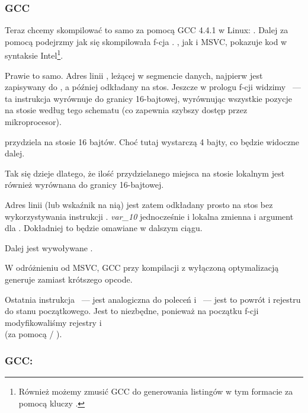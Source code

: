 \subsubsection{GCC}

Teraz chcemy skompilować to samo za pomocą GCC 4.4.1 w Linux: .
Dalej za pomocą \IDA podejrzmy jak się skompilowała f-cja \main.
\IDA, jak i MSVC, pokazuje kod w syntaksie Intel\footnote{Również możemy zmusić GCC do generowania listingów w tym formacie za pomocą kluczy .}.



Prawie to samo. 
Adres linii , leżącej w segmencie danych, najpierw jest zapisywany do \EAX, a później odkładany na stos.
Jeszcze w prologu f-cji widzimy ~--- 
ta instrukcja wyrównuje \ESP do granicy 16-bajtowej, wyrównując wszystkie pozycje 
na stosie według tego schematu (co zapewnia szybszy dostęp przez mikroprocesor).

 przydziela na stosie 16 bajtów. Choć tutaj wystarczą 4 bajty, co będzie widoczne dalej.

Tak się dzieje dlatego, że ilość przydzielanego miejsca na stosie lokalnym jest również wyrównana do granicy 16-bajtowej.

Adres linii (lub wskaźnik na nią) jest zatem odkładany prosto na stos bez wykorzystywania instrukcji \PUSH.
\emph{var\_10} jednocześnie i lokalna zmienna i argument dla \printf{}. Dokładniej to będzie omawiane w dalszym ciągu.

Dalej jest wywoływane \printf.

W odróżnieniu od MSVC, GCC przy kompilacji z wyłączoną optymalizacją generuje  zamiast krótszego opcode.

Ostatnia instrukcja \LEAVE~--- jest analogiczna do poleceń  i ~--- jest to powrót  i rejestru \EBP do stanu początkowego.
Jest to niezbędne, ponieważ na początku f-cji modyfikowaliśmy rejestry \ESP i \EBP{}\\
(za pomocą  / ).

\subsubsection{GCC: \ATTSyntax}
\label{ATT_syntax}

